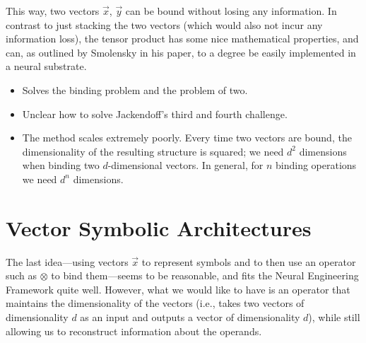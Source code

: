 \documentclass[10pt,letterpaper,oneside]{article}
\begin{document}
This way, two vectors $\vec x$, $\vec y$ can be bound without losing any information. In contrast to just stacking the two vectors (which would also not incur any information loss), the tensor product has some nice mathematical properties, and can, as outlined by Smolensky in his paper, to a degree be easily implemented in a neural substrate.
\begin{itemize}
	\item[\OPlus] Solves the binding problem and the problem of two.
	\item[\OMeh] Unclear how to solve Jackendoff's third and fourth challenge.
	\item[\OMinus] The method scales extremely poorly. Every time two vectors are bound, the dimensionality of the resulting structure is squared; we need $d^2$ dimensions when binding two $d$-dimensional vectors. In general, for $n$ binding operations we need $d^n$ dimensions.
\end{itemize}


\section{Vector Symbolic Architectures}

The last idea---using vectors $\vec x$ to represent symbols and to then use an operator such as $\otimes$ to bind them---seems to be reasonable, and fits the Neural Engineering Framework quite well. However, what we would like to have is an operator that maintains the dimensionality of the vectors (i.e., takes two vectors of dimensionality $d$ as an input and outputs a vector of dimensionality $d$), while still allowing us to reconstruct information about the operands.
\end{document}
